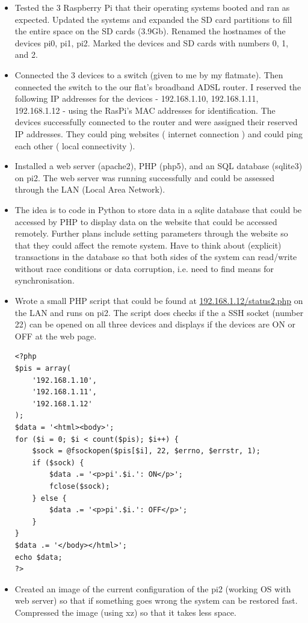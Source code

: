 \documentclass[a4paper,12pt]{article}
\begin{document}
\begin{itemize}
	\item Tested the 3 Raspberry Pi that their operating systems booted and ran as expected. Updated the systems and expanded the SD card partitions to fill the entire space on the SD cards (3.9Gb). Renamed the hostnames of the devices pi0, pi1, pi2. Marked the devices and SD cards with numbers 0, 1, and 2.
	\item Connected the 3 devices to a switch (given to me by my flatmate). Then connected the switch to the our flat's broadband ADSL router. I reserved the following IP addresses for the devices - 192.168.1.10, 192.168.1.11, 192.168.1.12 - using the RasPi's MAC addresses for identification. The devices successfully connected to the router and were assigned their reserved IP addresses. They could ping websites ( internet connection ) and could ping each other ( local connectivity ).
	\item Installed a web server (apache2), PHP (php5), and an SQL database (sqlite3) on pi2. The web server was running successfully and could be assessed through the LAN (Local Area Network).
	\item The idea is to code in Python to store data in a sqlite database that could be accessed by PHP to display data on the website that could be accessed remotely. Further plans include setting parameters through the website so that they could affect the remote system. Have to think about (explicit) transactions in the database so that both sides of the system can read/write without race conditions or data corruption, i.e. need to find means for synchronisation.
	\item Wrote a small PHP script that could be found at \url{192.168.1.12/status2.php} on the LAN and runs on pi2. The script does checks if the a SSH socket (number 22) can be opened on all three devices and displays if the devices are ON or OFF at the web page.
\begin{lstlisting}
<?php
$pis = array(
	'192.168.1.10',
	'192.168.1.11',
	'192.168.1.12'
);
$data = '<html><body>';
for ($i = 0; $i < count($pis); $i++) {
	$sock = @fsockopen($pis[$i], 22, $errno, $errstr, 1);
	if ($sock) {
		$data .= '<p>pi'.$i.': ON</p>';
		fclose($sock);
	} else {
		$data .= '<p>pi'.$i.': OFF</p>';
	}
}
$data .= '</body></html>';
echo $data;
?>
\end{lstlisting}
	\item Created an image of the current configuration of the pi2 (working OS with web server) so that if something goes wrong the system can be restored fast. Compressed the image (using xz) so that it takes less space.

\end{itemize}
\end{document}
